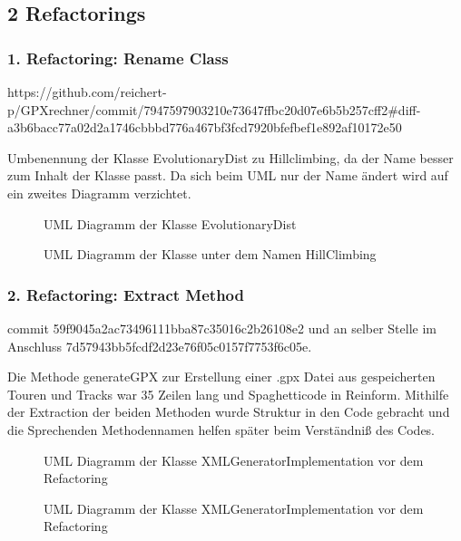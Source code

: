 \subsection{2 Refactorings}

\subsubsection{1. Refactoring: Rename Class}

https://github.com/reichert-p/GPXrechner/commit/7947597903210e73647ffbc20d07e6b5b257cff2\#diff-a3b6bacc77a02d2a1746cbbbd776a467bf3fcd7920bfefbef1e892af10172e50 

Umbenennung der Klasse EvolutionaryDist zu Hillclimbing, da der Name besser zum Inhalt der Klasse passt. Da sich beim UML nur der Name ändert wird auf ein zweites Diagramm verzichtet.

\begin{figure}[H]
  \centering
  
  \caption{UML Diagramm der Klasse EvolutionaryDist}
\end{figure}

\begin{figure}[H]
  \centering
  
  \caption{UML Diagramm der Klasse unter dem Namen HillClimbing}
\end{figure}

\subsubsection{2. Refactoring: Extract Method}

commit 59f9045a2ac73496111bba87c35016c2b26108e2 und an selber Stelle im Anschluss 7d57943bb5fcdf2d23e76f05c0157f7753f6c05e.

Die Methode generateGPX zur Erstellung einer .gpx Datei aus gespeicherten Touren und Tracks war 35 Zeilen lang und Spaghetticode in Reinform. Mithilfe der Extraction der beiden Methoden wurde Struktur in den Code gebracht und die Sprechenden Methodennamen helfen später beim Verständniß des Codes.

\begin{figure}[H]
  \centering
  
  \caption{UML Diagramm der Klasse XMLGeneratorImplementation vor dem Refactoring}
\end{figure}

\begin{figure}[H]
  \centering
  
  \caption{UML Diagramm der Klasse XMLGeneratorImplementation vor dem Refactoring}
\end{figure}